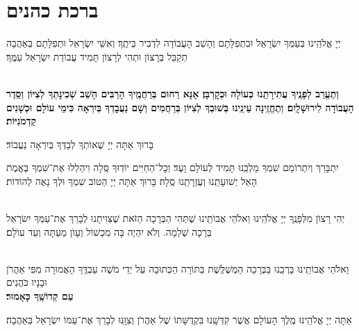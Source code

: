\documentclass[twoside, openany, parskip=half, 11pt]{book}
\begin{document}
\section[ברכת כהנים]{ ברכת כהנים ‎}
\label{birkaskohanim}

יְיָ אֱלֹהֵֽינוּ בְּעַמְּךָ יִשְׂרָאֵל וּבִתְפִלָּתָם וְהָשֵׁב הָעֲבוֹדָה לִדְבִיר בֵּיתֶֽךָ׃ וְאִשֵּׁי יִשְׂרָאֵל וּתְפִלָּתָם בְּאַהֲבָה תְקַבֵּל בְּרָצוֹן וּתְהִי לְרָצוֹן תָּמִיד עֲבוֹדַת יִשְׂרָאֵל עַמֶּֽךָ׃

\chazzanvkahal \\
\textbf{
וְתֶעֱרַב לְפָנֶֽיךָ עֲתִירָתֵֽנוּ כְּעוֹלָה וּכְקׇרְבָּן׃
אָנָּא רַחוּם בְּרַחֲמֶֽיךָ הָרַבִּים הָשֵׁב שְׁכִינָתְךָ לְצִיּוֹן וְסֵֽדֶר הָעֲבוֹדָה לִירוּשָׁלָֽיִם׃
וְתֶחֱזֶֽינָה עֵינֵֽינוּ בְּשׁוּבְךָ לְצִיּוֹן בְּרַחֲמִים
וְשָׁם נַעֲבׇדְךָ בְּיִרְאָה כִּימֵי עוֹלָם וּכְשָׁנִים קַדְמֹנִיּוֹת׃
}

\shatz
בָּרוּךְ אַתָּה יְיָ שֶׁאוֹתְךָ לְבַדְּךָ בְּיִרְאָה נַעֲבוֹד׃

\modim

יִתְבָּרַךְ וְיִתְרוֹמַם שִׁמְךָ מַלְכֵּֽנוּ תָּמִיד לְעוֹלָם וָעֶד׃ וְכׇל־הַחַיִּים יוֹדֽוּךָ סֶּֽלָה וִיהַלְלוּ אֶת־שִׁמְךָ בֶּאֱמֶת הָאֵל יְשׁוּעָתֵֽנוּ וְעֶזְרָתֵֽנוּ סֶֽלָה׃ בָּרוּךְ אַתָּה יְיָ הַטּוֹב שִׁמְךָ וּלְךָ נָאֶה לְהוֹדוֹת׃

\\
יְהִי רָצוׂן מִלְּפָנֶֽךָ יְיָ אֱלֹהֵֽינוּ וֵאלֹהֵי אֲבוׂתֵֽינוּ שֶׁתְּהִי הַבְּרָכָה הַזֹּאת שֶׁצִּוִּיתָנוּ לְבָרֵךְ אֶת־עַמְּךָ יִשׂרָאֵל בְּרָכָה שְׁלֵמָה. וְלֹא יִהְיֶה בָּה מִכְשׁוֹל וְעָוׂן מֵעַתָּה וְעַד עוׂלָם׃

\\
\shatz {}
וֵאלֹהֵי אֲבוֹתֵֽינוּ בָּרְכֵֽנוּ בַּבְּרָכָה הַמְשֻׁלֶּֽשֶׁת בַּתּוֹרָה הַכְּתוּבָה עַל יְדֵי מֹשֶׁה עַבְדֶּֽךָ הָאֲמוּרָה מִפִּי אַהֲרֹן וּבָנָיו כֹּהֲנִים \\
\shatzvkahal
\textbf{עַם קְדוֹשֶֽׁךָ כָּאָמוּר׃}

אַתָּה יְיָ אֱלֹהֵֽינוּ מֶֽלֶךְ הָעוֹלָם אֲשֶׁר קִדְּשָֽׁנוּ בִּקְדֻשָּׁתוֹ שֶׁל אַהֲרֹן וְצִוָּֽנוּ לְבָרֵךְ אֶת־עַמּוֹ יִשְׂרָאֵל בְּאַהֲבָה׃

\end{document}
